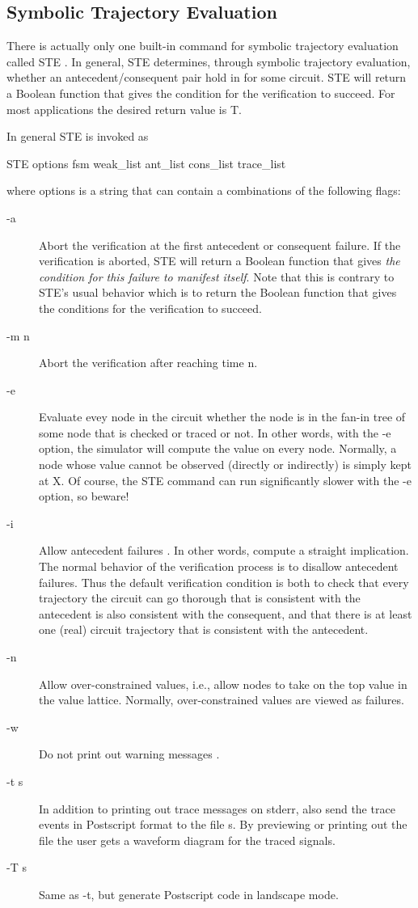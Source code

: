 \subsection{Symbolic Trajectory Evaluation}

There is actually only one built-in command for symbolic trajectory%
%
{}
evaluation called STE%
%
{}.
In general, STE determines, through symbolic trajectory evaluation, whether
an antecedent/consequent pair hold in for some circuit.
STE will return a Boolean function that gives the condition for the
verification to succeed.
For most applications the desired return value is T.

In general STE is invoked as
\begin{hol}
STE options fsm weak\_list ant\_list cons\_list trace\_list
\end{hol}
where options%
%
{} is a string that can contain a combinations of the
following flags:
\begin{description}
\item[-a] Abort%
%
{} the verification at the first antecedent or consequent failure.
If the verification is aborted, STE will return a Boolean function that
gives {\em the condition for this failure to manifest itself}.
Note that this is contrary to STE's usual behavior which is to return
the Boolean function that gives the conditions for the verification to
succeed.
\item [-m n]
Abort the verification after reaching time n.
\item [-e]
Evaluate evey node in the circuit whether the node is in the
fan-in tree of some node that is checked or traced or not.
In other words, with the -e option, the simulator will compute
the value on every node. Normally, a node whose value
cannot be observed (directly or indirectly) is simply kept at X.
Of course, the STE command can run significantly slower with the
-e option, so beware!
\item [-i]
Allow antecedent failures%
%
{}.
In other words, compute a straight implication.
The normal behavior of the verification process is to disallow
antecedent failures.
Thus the default verification condition is both to check that every
trajectory the circuit can go thorough that is consistent with the
antecedent is also consistent with the consequent, and that there
is at least one (real) circuit trajectory that is consistent
with the antecedent.
\item [-n]
Allow over-constrained values, i.e., allow nodes to take
on the top value in the value lattice.
Normally, over-constrained values are viewed as failures.
\item[-w]
Do not print out warning messages%
%
{}.
\item[-t s]
In addition to printing out trace messages on stderr, also send
the trace events in Postscript%
%
{} format to the file s.
By previewing or printing out the file the user gets a waveform diagram for
the traced signals.
\item[-T s]
Same as -t, but generate Postscript code in landscape mode.
\end{description}

